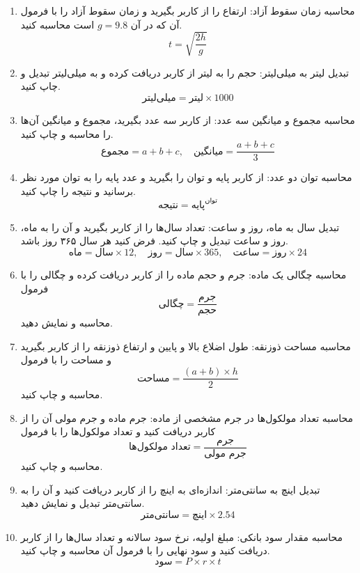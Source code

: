 \documentclass[a4paper,12pt]{article}
\begin{document}
\begin{enumerate}
		\item محاسبه زمان سقوط آزاد: ارتفاع را از کاربر بگیرید و زمان سقوط آزاد را با فرمول آن که در آن \(g=9.8\) است محاسبه کنید.
		\[
		t = \sqrt{\frac{2h}{g}}
		\]
		
		\item تبدیل لیتر به میلی‌لیتر: حجم را به لیتر از کاربر دریافت کرده و به میلی‌لیتر تبدیل و چاپ کنید.
		\[
		\text{میلی‌لیتر} = \text{لیتر} \times 1000
		\]
		
		\item محاسبه مجموع و میانگین سه عدد: از کاربر سه عدد بگیرید، مجموع و میانگین آن‌ها را محاسبه و چاپ کنید.
		\[
		\text{مجموع} = a + b + c, \quad \text{میانگین} = \frac{a + b + c}{3}
		\]
		
		\item محاسبه توان دو عدد: از کاربر پایه و توان را بگیرید و عدد پایه را به توان مورد نظر برسانید و نتیجه را چاپ کنید.
		\[
		\text{نتیجه} = \text{پایه}^{\text{توان}}
		\]
		
		\item تبدیل سال به ماه، روز و ساعت: تعداد سال‌ها را از کاربر بگیرید و آن را به ماه، روز و ساعت تبدیل و چاپ کنید. فرض کنید هر سال ۳۶۵ روز باشد.
		\[
		\text{ماه} = \text{سال} \times 12, \quad \text{روز} = \text{سال} \times 365, \quad \text{ساعت} = \text{روز} \times 24
		\]
		
		\item محاسبه چگالی یک ماده: جرم و حجم ماده را از کاربر دریافت کرده و چگالی را با فرمول
		\[
		\text{چگالی} = \frac{\text{جرم}}{\text{حجم}}
		\]
		محاسبه و نمایش دهید.
		
		\item محاسبه مساحت ذوزنقه: طول اضلاع بالا و پایین و ارتفاع ذوزنقه را از کاربر بگیرید و مساحت را با فرمول
		\[
		\text{مساحت} = \frac{(a + b) \times h}{2}
		\]
		محاسبه و چاپ کنید.
		
		\item محاسبه تعداد مولکول‌ها در جرم مشخصی از ماده: جرم ماده و جرم مولی آن را از کاربر دریافت کنید و تعداد مولکول‌ها را با فرمول
		\[
		\text{تعداد مولکول‌ها} = \frac{\text{جرم}}{\text{جرم مولی}}
		\]
		محاسبه و چاپ کنید.
		
		\item تبدیل اینچ به سانتی‌متر: اندازه‌ای به اینچ را از کاربر دریافت کنید و آن را به سانتی‌متر تبدیل و نمایش دهید.
		\[
		\text{سانتی‌متر} = \text{اینچ} \times 2.54
		\]
		
		\item محاسبه مقدار سود بانکی: مبلغ اولیه، نرخ سود سالانه و تعداد سال‌ها را از کاربر دریافت کنید و سود نهایی را با فرمول آن محاسبه و چاپ کنید.
		\[
		\text{سود} = P \times r \times t
		\]
		
	\end{enumerate}
	
\end{document}
